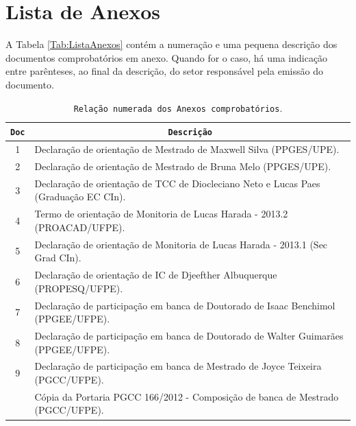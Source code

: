 \documentclass[a4paper,oneside,10pt]{article}
\newcommand{\otoprule}{\midrule[\heavyrulewidth]}
\newcounter{document}%
\begin{document}

\newpage
\section{Lista de Anexos}

A Tabela \ref{Tab:ListaAnexos} cont\'{e}m a numera\c{c}\~{a}o e uma pequena descri\c{c}\~{a}o dos documentos comprobat\'{o}rios em anexo. Quando for o caso, h\'{a} uma indica\c{c}\~{a}o entre par\^{e}nteses, ao final da descri\c{c}\~{a}o, do setor respons\'{a}vel pela emiss\~{a}o do documento.


\begin{table}[h]
\small
\caption{\texttt{Rela\c{c}\~{a}o numerada dos Anexos comprobat\'{o}rios}.}
\begin{tabular}{cl}
\toprule
\large{\textbf{\texttt{Doc}}} & \multicolumn{1}{c}{\large{\textbf{\texttt{Descri\c{c}\~{a}o}}}} \\
\otoprule
  1 & Declara\c{c}\~{a}o de orienta\c{c}\~{a}o de Mestrado de Maxwell Silva (PPGES/UPE). \\
  2 & Declara\c{c}\~{a}o de orienta\c{c}\~{a}o de Mestrado de Bruna Melo (PPGES/UPE). \\
  3 & Declara\c{c}\~{a}o de orienta\c{c}\~{a}o de TCC de Diocleciano Neto e Lucas Paes (Gradua\c{c}\~{a}o EC CIn). \\
  4 & Termo de orienta\c{c}\~{a}o de Monitoria de Lucas Harada - 2013.2 (PROACAD/UFPE). \\
  5 & Declara\c{c}\~{a}o de orienta\c{c}\~{a}o de Monitoria de Lucas Harada - 2013.1 (Sec Grad CIn). \\
  6 & Declara\c{c}\~{a}o de orienta\c{c}\~{a}o de IC de Djeefther Albuquerque (PROPESQ/UFPE). \\
  7 & Declara\c{c}\~{a}o de participa\c{c}\~{a}o em banca de Doutorado de Isaac Benchimol (PPGEE/UFPE). \\
  8 & Declara\c{c}\~{a}o de participa\c{c}\~{a}o em banca de Doutorado de Walter Guimar\~{a}es (PPGEE/UFPE). \\
  \cmidrule{1-2}
  9 & Declara\c{c}\~{a}o de participa\c{c}\~{a}o em banca de Mestrado de Joyce Teixeira (PGCC/UFPE). \\
    & C\'{o}pia da Portaria PGCC 166/2012 - Composi\c{c}\~{a}o de banca de Mestrado (PGCC/UFPE). \\

\end{tabular}
\end{table}
\end{document}
